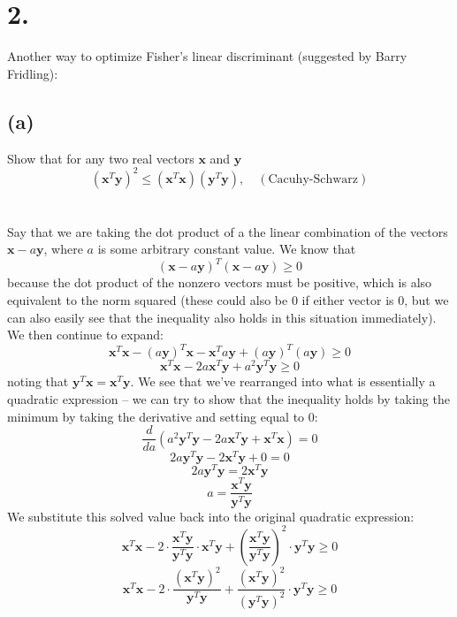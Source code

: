 \documentclass{article}
\begin{document}
{\Large 

\section*{2.}
Another way to optimize Fisher's linear discriminant (suggested by Barry Fridling):

\subsection*{(a)} 
Show that for any two real vectors \(\mathbf{x}\) and \(\mathbf{y}\) 
\[
  (\mathbf{x}^T \mathbf{y})^2 \leq (\mathbf{x}^T \mathbf{x}) (\mathbf{y}^T \mathbf{y}), \quad (\text{Cacuhy-Schwarz})
\] \\ \\
Say that we are taking the dot product of a the linear combination of the vectors \(\mathbf{x} - a\mathbf{y}\), where \(a\) is some arbitrary constant value. We know that 
\[
  (\mathbf{x} - a\mathbf{y})^T(\mathbf{x} - a\mathbf{y}) \geq 0
\]
because the dot product of the nonzero vectors must be positive, which is also equivalent to the norm squared (these could also be 0 if either vector is 0, but we can also easily see that the inequality also holds in this situation immediately). We then continue to expand:
\[
  \mathbf{x}^T\mathbf{x} - (a \mathbf{y})^T \mathbf{x} - \mathbf{x}^T a \mathbf{y} + (a \mathbf{y})^T (a \mathbf{y}) \geq 0
\]
\[
  \mathbf{x}^T\mathbf{x} - 2a \mathbf{x}^T \mathbf{y} + a^2 \mathbf{y}^T \mathbf{y} \geq 0
\]
noting that \(\mathbf{y}^T \mathbf{x} = \mathbf{x}^T \mathbf{y}\). We see that we've rearranged into what is essentially a quadratic expression -- we can try to show that the inequality holds by taking the minimum by taking the derivative and setting equal to 0: 
\[
  \frac{d}{da} (a^2 \mathbf{y}^T \mathbf{y} - 2a \mathbf{x}^T \mathbf{y} + \mathbf{x}^T\mathbf{x}) = 0
\]
\[
  2a \mathbf{y}^T \mathbf{y} - 2 \mathbf{x}^T \mathbf{y} + 0 = 0
\]
\[
  2a \mathbf{y}^T \mathbf{y} = 2 \mathbf{x}^T \mathbf{y}
\]
\[
  a = \frac{\mathbf{x}^T \mathbf{y}}{\mathbf{y}^T \mathbf{y}}
\]
We substitute this solved value back into the original quadratic expression:
\[
  \mathbf{x}^T\mathbf{x} - 2 \cdot \frac{\mathbf{x}^T \mathbf{y}}{\mathbf{y}^T \mathbf{y}} \cdot \mathbf{x}^T \mathbf{y} + (\frac{\mathbf{x}^T \mathbf{y}}{\mathbf{y}^T \mathbf{y}})^2 \cdot  \mathbf{y}^T \mathbf{y} \geq 0
\]
\[
  \mathbf{x}^T\mathbf{x} - 2 \cdot \frac{(\mathbf{x}^T \mathbf{y})^2}{\mathbf{y}^T \mathbf{y}} + \frac{(\mathbf{x}^T \mathbf{y})^2}{(\mathbf{y}^T \mathbf{y})^2} \cdot \mathbf{y}^T \mathbf{y} \geq 0
\]}
\end{document}
